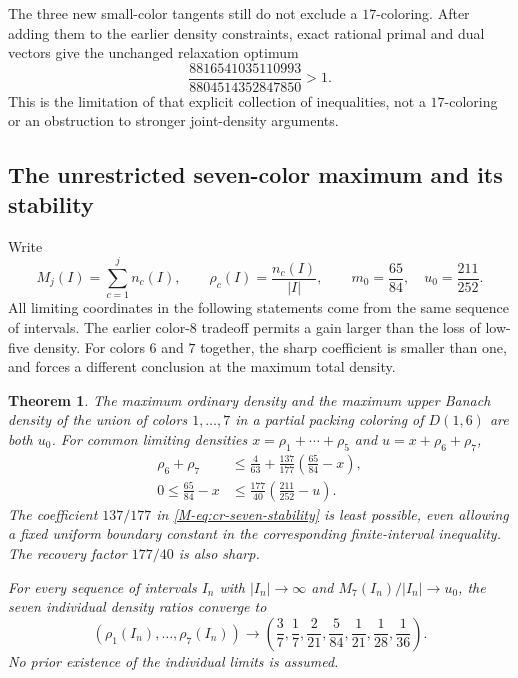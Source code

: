 \documentclass[11pt,reqno]{amsart}
\theoremstyle{plain}
\newtheorem{theorem}{Theorem}
\newcommand{\D}[1]{D(1,#1)}
\theoremstyle{plain}
\theoremstyle{plain}
\begin{document}
The three new small-color tangents still do not exclude a $17$-coloring.
After adding them to the earlier density constraints, exact rational
primal and dual vectors give the unchanged relaxation optimum
\[
\frac{8816541035110993}{8804514352847850}>1.
\]
This is the limitation of that explicit collection of inequalities,
not a $17$-coloring or an obstruction to stronger joint-density arguments.




\subsection{The unrestricted seven-color maximum and its stability}
\label{M-sec:cr-seven}

Write
\[
 M_j(I)=\sum_{c=1}^j n_c(I),\qquad
 \rho_c(I)=\frac{n_c(I)}{|I|},\qquad
 m_0=\frac{65}{84},\quad u_0=\frac{211}{252}.
\]
All limiting coordinates in the following statements come from the same
sequence of intervals. The earlier color-$8$ tradeoff permits a gain
larger than the loss of low-five density. For colors $6$ and $7$ together,
the sharp coefficient is smaller than one, and forces a different
conclusion at the maximum total density.

\begin{theorem}\label{M-thm:cr-seven}
The maximum ordinary density and the maximum upper Banach density of
the union of colors $1,\ldots,7$ in a partial packing coloring of
$\D{6}$ are both $u_0$. For common limiting densities
$x=\rho_1+\cdots+\rho_5$ and $u=x+\rho_6+\rho_7$,
\begin{align}
 \rho_6+\rho_7&\le \frac4{63}+
            \frac{137}{177}\left(\frac{65}{84}-x\right),
             \label{M-eq:cr-seven-stability}\\
 0\le\frac{65}{84}-x&\le
            \frac{177}{40}\left(\frac{211}{252}-u\right).
             \label{M-eq:cr-seven-recovery}
\end{align}
The coefficient $137/177$ in \eqref{M-eq:cr-seven-stability} is least
possible, even allowing a fixed uniform boundary constant in the
corresponding finite-interval inequality. The recovery factor $177/40$
is also sharp.

For every sequence of intervals $I_n$ with $|I_n|\to\infty$ and
$M_7(I_n)/|I_n|\to u_0$, the seven individual density ratios converge to
\begin{equation}\label{M-eq:cr-seven-individual}
 (\rho_1(I_n),\ldots,\rho_7(I_n))\longrightarrow
 \left(\frac37,\frac17,\frac2{21},\frac5{84},\frac1{21},
       \frac1{28},\frac1{36}\right).
\end{equation}
No prior existence of the individual limits is assumed.
\end{theorem}
\end{document}
